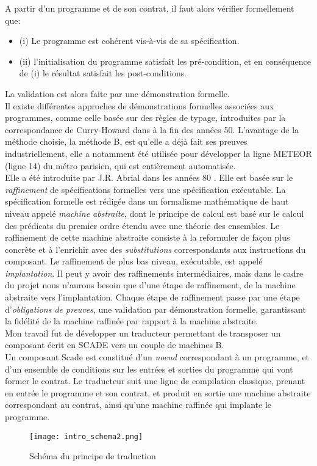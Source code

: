 \noindent
A partir d'un programme et de son contrat, il faut alors vérifier formellement
que: 
\begin{itemize}
\item  (i) Le programme est cohérent vis-à-vis de sa spécification.
\item (ii) l'initialisation du programme satisfait les pré-condition, et en
conséquence de (i) le résultat satisfait les post-conditions.
\end{itemize}
La validation est alors faite par une démonstration formelle.\\

Il existe différentes approches de démonstrations formelles associées aux programmes, comme celle basée
sur des règles de typage, introduites par la correspondance de
Curry-Howard dans à la fin des années 50. 
L'avantage de la méthode choisie, la méthode B, est qu'elle a déjà
fait ses preuves industriellement, elle a notamment été utilisée pour
développer la ligne METEOR (ligne 14) du métro parisien, qui est
entièrement automatisée.\\ 
Elle a été introduite
par J.R. Abrial dans les années 80 \cite{JRA}. Elle est basée sur le \emph{raffinement} de
spécifications formelles vers une spécification exécutable. La spécification
formelle est rédigée dans un formalisme mathématique de haut niveau appelé
\emph{machine abstraite}, dont le principe de calcul est basé sur le calcul
des prédicats du premier ordre étendu avec une théorie des
ensembles. Le raffinement de cette machine abstraite consiste à la
reformuler de façon plus concrète et à l'enrichir avec des
\emph{substitutions} correspondants aux instructions du composant. Le
raffinement de plus bas niveau, exécutable, est appelé \emph{implantation}. Il peut y
avoir des raffinements intermédiaires, mais dans le cadre du projet nous n'aurons besoin que
d'une étape de raffinement, de la machine abstraite vers l'implantation. Chaque
étape de raffinement passe par une étape d'\emph{obligations de preuves}, une
validation par démonstration formelle, garantissant la fidélité de la
machine raffinée par rapport à la machine abstraite. \\

Mon travail fut de développer un traducteur permettant de transposer un
composant écrit en SCADE vers un couple de machines B. \\
Un composant Scade est constitué d'un \emph{noeud}
correspondant à un programme, et d'un ensemble de conditions sur les
entrées et sorties du programme qui vont former le contrat. 
Le traducteur suit une ligne de compilation classique, prenant en
entrée le programme et son contrat, et produit en sortie une machine abstraite
correspondant au contrat, ainsi qu'une machine raffinée qui implante le programme. \\

\begin{figure}[h]
\begin{center}
\texttt{[image: intro\_schema2.png]}
\end{center}
\caption{Schéma du principe de traduction}
\end{figure}
